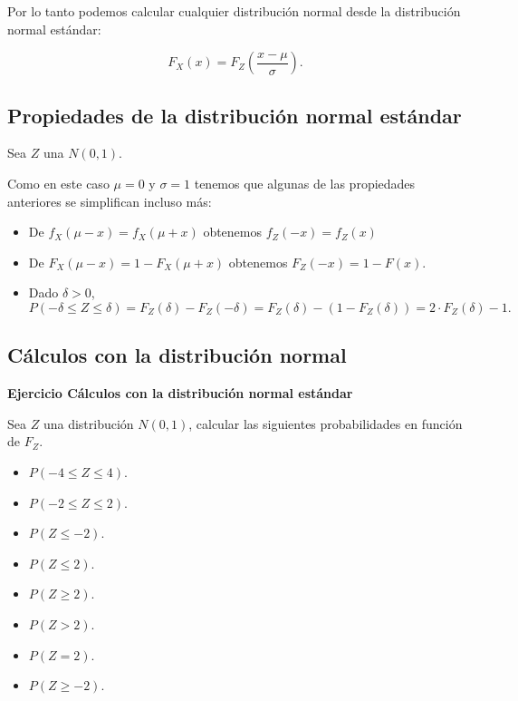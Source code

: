 \documentclass[]{book}
\providecommand{\tightlist}{%
  \setlength{\itemsep}{0pt}\setlength{\parskip}{0pt}}
\begin{document}
Por lo tanto podemos calcular cualquier distribución normal desde la distribución normal estándar:

\[
F_X(x)=F_Z \left(\frac{x-\mu}{\sigma}\right).
\]

\hypertarget{propiedades-de-la-distribuciuxf3n-normal-estuxe1ndar}{%
\subsection{Propiedades de la distribución normal estándar}\label{propiedades-de-la-distribuciuxf3n-normal-estuxe1ndar}}

Sea \(Z\) una \(N(0,1)\).

Como en este caso \(\mu=0\) y \(\sigma=1\) tenemos que algunas de las propiedades anteriores se simplifican incluso más:

\begin{itemize}
\tightlist
\item
  De \(f_X(\mu-x)=f_X(\mu+x)\) obtenemos \(f_Z(-x)=f_Z(x)\)
\item
  De \(F_X(\mu-x)=1-F_X(\mu+x)\) obtenemos \(F_Z(-x)=1-F(x).\)
\item
  Dado \(\delta>0\),
  \[
  P(-\delta\leq Z \leq \delta)=F_{Z}(\delta)-F_{Z}(-\delta)=F_Z(\delta)-(1-F_Z(\delta))=
  2\cdot F_Z(\delta)-1.
  \]
\end{itemize}

\hypertarget{cuxe1lculos-con-la-distribuciuxf3n-normal}{%
\subsection{Cálculos con la distribución normal}\label{cuxe1lculos-con-la-distribuciuxf3n-normal}}

\textbf{Ejercicio Cálculos con la distribución normal estándar}

Sea \(Z\) una distribución \(N(0,1)\), calcular las siguientes probabilidades en función de \(F_Z\).

\begin{itemize}
\tightlist
\item
  \(P(-4\leq Z \leq 4).\)
\item
  \(P(-2\leq Z \leq 2).\)
\item
  \(P(Z\leq -2).\)
\item
  \(P( Z \leq 2).\)
\item
  \(P( Z \geq 2).\)
\item
  \(P( Z > 2).\)
\item
  \(P( Z = 2).\)
\item
  \(P( Z \geq -2).\)
\end{itemize}
\end{document}
